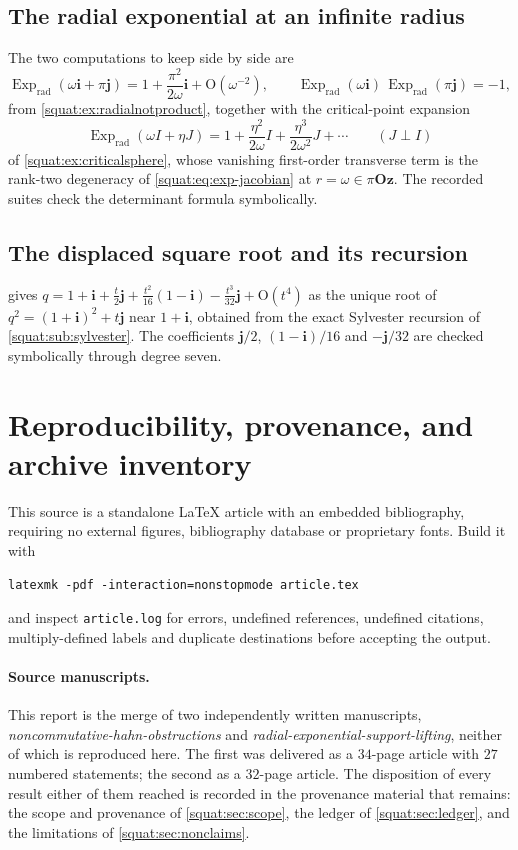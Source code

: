 \documentclass[11pt,letterpaper]{article}
\numberwithin{equation}{section}
\theoremstyle{definition}
\theoremstyle{remark}
\newcommand{\Oz}{\mathbf{Oz}}
\newcommand{\ii}{\mathbf i}
\newcommand{\jj}{\mathbf j}
\newcommand{\Exp}{\operatorname{Exp}}
\newcommand{\Expr}{\Exp_{\mathrm{rad}}}
\begin{document}
\subsection{The radial exponential at an infinite radius}
The two computations to keep side by side are
\[
 \Expr(\omega\ii+\pi\jj)=1+\frac{\pi^2}{2\omega}\ii+\mathrm O(\omega^{-2}),
 \qquad
 \Expr(\omega\ii)\,\Expr(\pi\jj)=-1,
\]
from \cref{squat:ex:radialnotproduct}, together with the critical-point expansion
\[
 \Expr(\omega I+\eta J)=1+\frac{\eta^2}{2\omega}I+\frac{\eta^3}{2\omega^2}J+\cdots
 \qquad(J\perp I)
\]
of \cref{squat:ex:criticalsphere}, whose vanishing first-order transverse term is the
rank-two degeneracy of \cref{squat:eq:exp-jacobian} at $r=\omega\in\pi\Oz$. The recorded
suites check the determinant formula symbolically.

\subsection{The displaced square root and its recursion}
 gives
$q=1+\ii+\tfrac t2\jj+\tfrac{t^2}{16}(1-\ii)-\tfrac{t^3}{32}\jj+\mathrm O(t^4)$ as the
unique root of $q^2=(1+\ii)^2+t\jj$ near $1+\ii$, obtained from the exact Sylvester
recursion of \cref{squat:sub:sylvester}. The coefficients $\jj/2$, $(1-\ii)/16$ and
$-\jj/32$ are checked symbolically through degree seven.

\section{Reproducibility, provenance, and archive inventory}\label{squat:app:reproduce}

This source is a standalone \LaTeX{} article with an embedded bibliography, requiring no
external figures, bibliography database or proprietary fonts. Build it with
\begin{verbatim}
latexmk -pdf -interaction=nonstopmode article.tex
\end{verbatim}
and inspect \texttt{article.log} for errors, undefined references, undefined citations,
multiply-defined labels and duplicate destinations before accepting the output.

\paragraph{Source manuscripts.} This report is the merge of two independently written
manuscripts, \emph{noncommutative-hahn-\allowbreak obstructions} and
\emph{radial-exponential-\allowbreak support-lifting}, neither of which is reproduced
here. The first was delivered as a $34$-page article with $27$ numbered statements; the
second as a $32$-page article. The disposition of every result either of them reached is
recorded in the provenance material that remains: the scope and provenance of
\cref{squat:sec:scope}, the ledger of \cref{squat:sec:ledger}, and the limitations of
\cref{squat:sec:nonclaims}.
\end{document}
